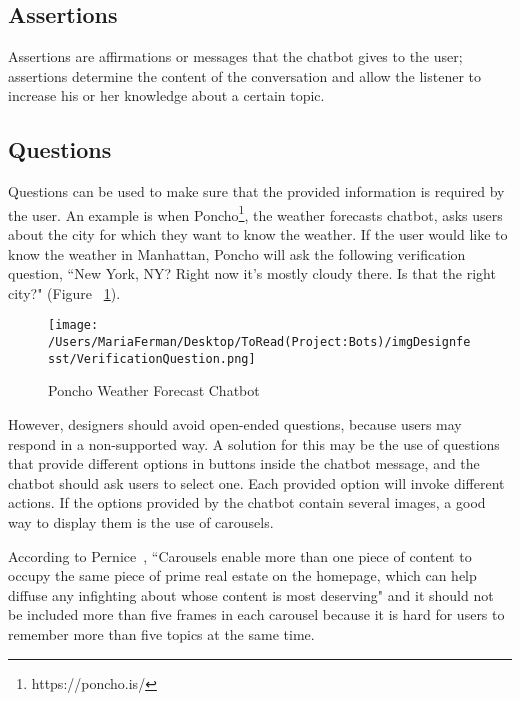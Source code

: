 \documentclass[a4paper,10pt]{article}
\begin{document}
\subsection{Assertions}
Assertions are affirmations or messages that the chatbot gives to the user; assertions determine the content of the conversation and allow the listener to increase his or her knowledge about a certain topic. 

\subsection{Questions}
Questions can be used to make sure that the provided information is required by the user. An example is when Poncho\footnote{https://poncho.is/}, the weather forecasts chatbot, asks users about the city for which they want to know the weather. If the user would like to know the weather in Manhattan, Poncho will ask the following verification question, ``New York, NY? Right now it's mostly cloudy there. Is that the right city?" (Figure ~\ref{FigureVerificationQuestion}). %

\begin{figure}
\centering
\texttt{[image: /Users/MariaFerman/Desktop/ToRead(Project:Bots)/imgDesignfesst/VerificationQuestion.png]}
\caption{Poncho Weather Forecast Chatbot}
\label{FigureVerificationQuestion}
\end{figure}

However, designers should avoid open-ended questions, because users may respond in a non-supported way. A solution for this may be the use of questions that provide different options in buttons inside the chatbot message, and the chatbot should ask users to select one. Each provided option will invoke different actions. If the options provided by the chatbot contain several images, a good way to display them is the use of carousels. 

According to Pernice~\cite{carousel}, ``Carousels enable more than one piece of content to occupy the same piece of prime real estate on the homepage, which can help diffuse any infighting about whose content is most deserving" and it should not be included more than five frames in each carousel because it is hard for users to remember more than five topics at the same time. 

\end{document}
